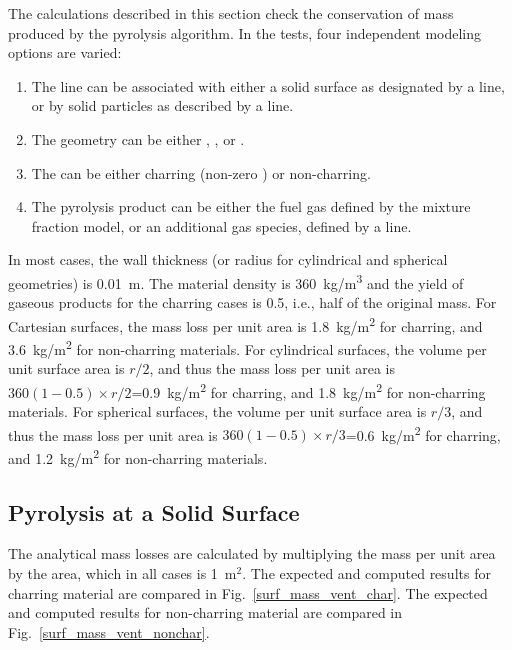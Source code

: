 \documentclass[11pt]{book}
\begin{document}
The calculations described in this section check the conservation of mass produced by the pyrolysis algorithm. In the tests, four independent modeling options are varied:
\begin{enumerate}
\item The  line can be associated with either a solid surface as designated by a  line, or by solid particles as described by a  line.
\item The  geometry can be either , , or .
\item The  can be either charring (non-zero ) or non-charring.
\item The pyrolysis product can be either the fuel gas defined by the mixture fraction model, or an additional gas species, defined by a  line.
\end{enumerate}
In most cases, the wall thickness (or radius for cylindrical and spherical geometries) is 0.01~m. The material density is 360~\si{kg/m^3} and the yield of gaseous products for the charring cases is 0.5, i.e., half of the original mass. For Cartesian surfaces, the mass loss per unit area is 1.8~\si{kg/m^2} for charring, and 3.6~\si{kg/m^2} for non-charring materials. For cylindrical surfaces, the volume per unit surface area is $r/2$, and thus the mass loss per unit area is $360(1-0.5) \times r/2$=0.9~\si{kg/m^2} for charring, and 1.8~\si{kg/m^2} for non-charring materials. For spherical surfaces, the volume per unit surface area is $r/3$, and thus the mass loss per unit area is $360(1-0.5) \times r/3$=0.6~\si{kg/m^2} for charring, and 1.2~\si{kg/m^2} for non-charring materials.


\subsection{Pyrolysis at a Solid Surface}
\label{surf_mass_vent_char_cart_fuel}
\label{surf_mass_vent_char_cart_gas}
\label{surf_mass_vent_char_cyl_fuel}
\label{surf_mass_vent_char_cyl_gas}
\label{surf_mass_vent_char_spher_fuel}
\label{surf_mass_vent_char_spher_gas}
\label{surf_mass_vent_nonchar_cart_fuel}
\label{surf_mass_vent_nonchar_cart_gas}
\label{surf_mass_vent_nonchar_cyl_fuel}
\label{surf_mass_vent_nonchar_cyl_gas}
\label{surf_mass_vent_nonchar_spher_fuel}
\label{surf_mass_vent_nonchar_spher_gas}

The analytical mass losses are calculated by multiplying the mass per unit area by the  area, which in all cases is 1~m$^2$. The expected and computed results for charring material are compared in Fig.~\ref{surf_mass_vent_char}. The expected and computed results for non-charring material are compared in Fig.~\ref{surf_mass_vent_nonchar}.
\end{document}
